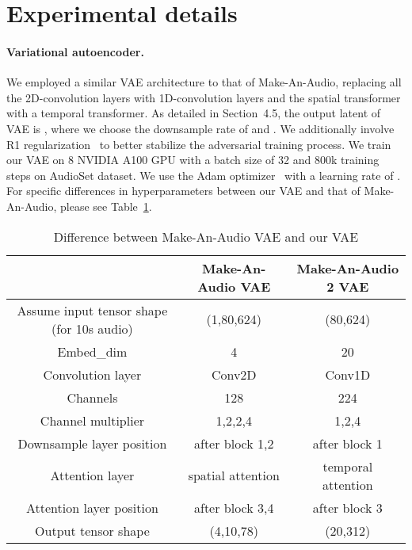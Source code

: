 \documentclass{article}
\begin{document}
\section{Experimental details}  \label{app:expeiment}
\paragraph{Variational autoencoder.}
 We employed a similar VAE architecture to that of Make-An-Audio, replacing all the 2D-convolution layers with 1D-convolution layers and the spatial transformer with a temporal transformer. As detailed in Section~4.5,  the output latent of VAE is , where we choose the downsample rate of  and . We additionally involve R1 regularization~\cite{r1reg} to better stabilize the adversarial training process. 
We train our VAE on 8 NVIDIA A100 GPU with a batch size of 32 and 800k training steps on AudioSet dataset. We use the Adam optimizer~\cite{kingma2014adam} with a learning rate of . For specific differences in hyperparameters between our VAE and that of Make-An-Audio, please see Table~\ref{tab:VAE_diff}.


\begin{table}[htbp]
  \centering
    \begin{tabular}{c|c|c}
    \toprule
      & Make-An-Audio VAE & Make-An-Audio 2 VAE \\
    \midrule 
    \multicolumn{1}{c|}{Assume input tensor shape (for 10s audio)} & (1,80,624) & (80,624) \\
    Embed\_dim & 4      & 20 \\
    Convolution layer & Conv2D & Conv1D \\ 
    Channels & 128    & 224 \\
    Channel multiplier & 1,2,2,4 & 1,2,4 \\
    Downsample layer position & after block 1,2 & after block 1 \\
    Attention layer & spatial attention & temporal attention \\
    Attention layer position & after block 3,4 & after block 3 \\
    Output tensor shape & (4,10,78) & (20,312) \\
    \bottomrule
    \end{tabular}\vspace{5pt}
  \caption{Difference between Make-An-Audio VAE and our VAE}
  \label{tab:VAE_diff}\end{table}
\end{document}
